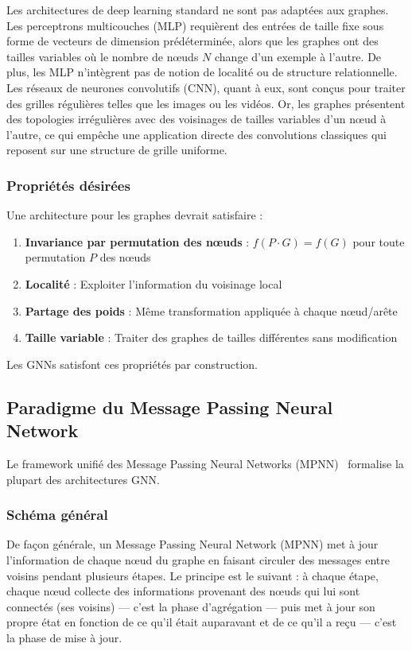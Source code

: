 Les architectures de deep learning standard ne sont pas adaptées aux graphes. Les perceptrons multicouches (MLP) requièrent des entrées de taille fixe sous forme de vecteurs de dimension prédéterminée, alors que les graphes ont des tailles variables où le nombre de nœuds $N$ change d'un exemple à l'autre. De plus, les MLP n'intègrent pas de notion de localité ou de structure relationnelle. Les réseaux de neurones convolutifs (CNN), quant à eux, sont conçus pour traiter des grilles régulières telles que les images ou les vidéos. Or, les graphes présentent des topologies irrégulières avec des voisinages de tailles variables d'un nœud à l'autre, ce qui empêche une application directe des convolutions classiques qui reposent sur une structure de grille uniforme.

\subsubsection{Propriétés désirées}

Une architecture pour les graphes devrait satisfaire :
\begin{enumerate}
    \item \textbf{Invariance par permutation des nœuds} : $f(P \cdot G) = f(G)$ pour toute permutation $P$ des nœuds
    \item \textbf{Localité} : Exploiter l'information du voisinage local
    \item \textbf{Partage des poids} : Même transformation appliquée à chaque nœud/arête
    \item \textbf{Taille variable} : Traiter des graphes de tailles différentes sans modification
\end{enumerate}
Les GNNs satisfont ces propriétés par construction.

\subsection{Paradigme du Message Passing Neural Network}

Le framework unifié des Message Passing Neural Networks (MPNN)~\cite{Gilmer2017} formalise la plupart des architectures GNN.

\subsubsection{Schéma général}

De façon générale, un Message Passing Neural Network (MPNN) met à jour l'information de chaque nœud du graphe en faisant circuler des messages entre voisins pendant plusieurs étapes. Le principe est le suivant : à chaque étape, chaque nœud collecte des informations provenant des nœuds qui lui sont connectés (ses voisins) — c'est la phase d'agrégation — puis met à jour son propre état en fonction de ce qu'il était auparavant et de ce qu'il a reçu — c'est la phase de mise à jour.

